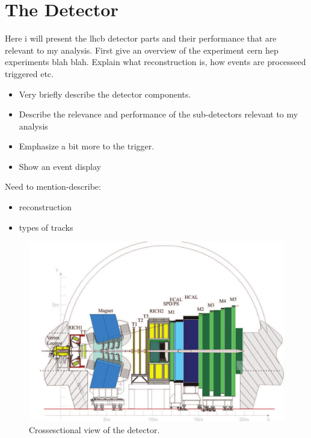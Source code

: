 

\chapter{The \lhcb Detector}
\label{lhcb_detector}

Here i will present the lhcb detector parts and their performance that are relevant to my analysis.
First give an overview of the experiment cern hep experiments blah blah. Explain what reconstruction
is, how events are processeed triggered etc.

\begin{itemize}
  \item Very briefly describe the detector components.
  \item Describe the relevance and performance of the sub-detectors relevant to my analysis
  \item Emphasize a bit more to the trigger.
  \item Show an event display
\end{itemize}

Need to mention-describe:
\begin{itemize}
  \item reconstruction
  \item types of tracks
\end{itemize}


\begin{figure}[t]
  \centering
  \includegraphics[width=\textwidth]{Figures/Chapter2/detector_cross_cmyk}
  \caption{Crossesctional view of the \lhcb detector.}
  \label{helAngles}
\end{figure}


